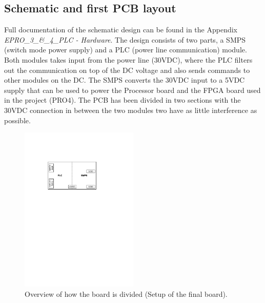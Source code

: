 \subsection{Schematic and first PCB layout}
Full documentation of the schematic design can be found in the Appendix \textit{EPRO\_3\_\&\_4\_PLC - Hardware}. The design consists of two parts, a SMPS (switch mode power supply) and a PLC (power line communication) module. Both modules takes input from the power line (30VDC), where the PLC filters out the communication on top of the DC voltage and also sends commands to other modules on the DC. The SMPS converts the 30VDC input to a 5VDC supply that can be used to power the Processor board and the FPGA board used in the project (PRO4). The PCB has been divided in two sections with the 30VDC connection in between the two modules two have as little interference as possible.
\begin{figure}[H]
	\begin{centering}
		 \includegraphics[width=0.5\textwidth]{images/pcb_design.pdf}
		\caption{Overview of how the board is divided (Setup of the final board).}
		\label{fig:board_overview}
	\end{centering}
\end{figure}


